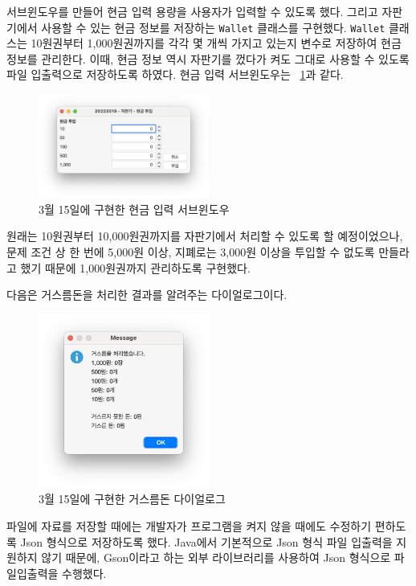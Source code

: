 \documentclass{oblivoir}
\newcommand{\figref}[1]{\figurename~\ref{#1}}
\begin{document}
    서브윈도우를 만들어 현금 입력 용량을 사용자가 입력할 수 있도록 했다.
    그리고 자판기에서 사용할 수 있는 현금 정보를 저장하는 \texttt{Wallet} 클래스를 구현했다.
    \texttt{Wallet} 클래스는 10원권부터 1,000원권까지를 각각 몇 개씩 가지고 있는지 변수로 저장하여 현금 정보를 관리한다.
    이때, 현금 정보 역시 자판기를 껐다가 켜도 그대로 사용할 수 있도록 파일 입출력으로 저장하도록 하였다.
    현금 입력 서브윈도우는 \figref{fig:0315-cash-input-prompt}과 같다.
    \begin{figure}[h]
        \centering
        \includegraphics[width=0.5\textwidth]{0315-cash-input-prompt}
        \caption{3월 15일에 구현한 현금 입력 서브윈도우}
        \label{fig:0315-cash-input-prompt}
    \end{figure}

    원래는 10원권부터 10,000원권까지를 자판기에서 처리할 수 있도록 할 예정이었으나,
    문제 조건 상 한 번에 5,000원 이상, 지폐로는 3,000원 이상을 투입할 수 없도록 만들라고 했기 때문에
    1,000원권까지 관리하도록 구현했다.

    다음은 거스름돈을 처리한 결과를 알려주는 다이얼로그이다.
    \begin{figure}[h]
        \centering
        \includegraphics[width=0.5\textwidth]{0315-change-dialog}
        \caption{3월 15일에 구현한 거스름돈 다이얼로그}
        \label{fig:0315-change-dialog}
    \end{figure}

    파일에 자료를 저장할 때에는 개발자가 프로그램을 켜지 않을 때에도 수정하기 편하도록 Json 형식으로 저장하도록 했다.
    Java에서 기본적으로 Json 형식 파일 입출력을 지원하지 않기 때문에, Gson이라고 하는 외부 라이브러리를 사용하여
    Json 형식으로 파일입출력을 수행했다.
\end{document}
